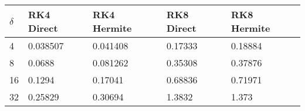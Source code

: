 \begin{tabular}{lllll}
\hline
$\delta$ & RK4 Direct & RK4 Hermite & RK8 Direct & RK8 Hermite \\ 
\hline 
4 & 0.038507 & 0.041408 & 0.17333 & 0.18884 \\ 
8 & 0.0688 & 0.081262 & 0.35308 & 0.37876 \\ 
16 & 0.1294 & 0.17041 & 0.68836 & 0.71971 \\ 
32 & 0.25829 & 0.30694 & 1.3832 & 1.373 \\ 
\hline 
\end{tabular}